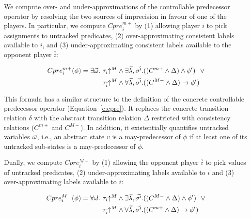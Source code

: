 We compute over- and under-approximations of the controllable predecessor operator by resolving the two sources of imprecision in favour of one of the players.  In particular, we compute $Cpre_i^{m+}$ by (1) allowing player $i$ to pick assignments to untracked predicates, (2) over-approximating consistent labels available to $i$, and (3) under-approximating consistent labels available to the opponent player $\overline{i}$:

\begin{equation}
\label{e:cprem}
\begin{aligned}
    Cpre_i^{m+}(\phi) = \exists \vec{\omega} .~&\tau_i\mathord{\uparrow^M}         \land \exists \vec{\lambda},\vec{\sigma'}. ((C^{m+} \land \Delta) \land \phi')
                                                 ~~\lor\\
                                                &\tau_{\overline{i}}\mathord{\uparrow^M} \land \forall \vec{\lambda},\vec{\sigma'}. ((C^{M-} \land\Delta) \rightarrow \phi')
\end{aligned}
\end{equation}

This formula has a similar structure to the definition of the concrete controllable predecessor operator (Equation~\ref{e:cpre}).  It replaces the concrete transition relation $\delta$ with the abstract transition relation $\Delta$ restricted with consistency relations ($C^{m+}$ and $C^{M-}$).  In addition, it existentially quantifies untracked variables $\vec{\omega}$, i.e., an abstract state $v$ is a may-predecessor of $\phi$ if at least one of its untracked sub-states is a may-predecessor of $\phi$.

Dually, we compute $Cpre_i^{M-}$ by (1) allowing the opponent player $\overline{i}$ to pick values of untracked predicates, (2) under-approximating labels available to $i$ and (3) over-approximating labels available to $\overline{i}$:

\begin{equation}
\label{e:cpreM}
\begin{aligned}
    Cpre_i^{M-}(\phi) = \forall \vec{\omega}.~&\tau_i\mathord{\uparrow^M}         \land \exists \vec{\lambda},\vec{\sigma'}. ((C^{M-} \land \Delta) \land \phi')
                                             ~~\lor\\
                                               &\tau_{\overline{i}}\mathord{\uparrow^M} \land \forall \vec{\lambda},\vec{\sigma'}. ((C^{m+} \land \Delta) \rightarrow \phi')
\end{aligned}
\end{equation}

